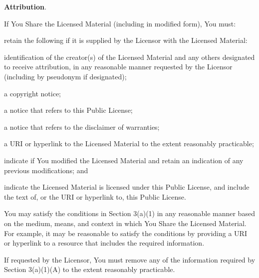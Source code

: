 	\begin{ccEnumerate}
		\item \par \textbf{Attribution}.
		      \begin{ccEnumerate}
		      	\item \par If You Share the Licensed Material (including in modified form), You must:
		      	      \begin{ccEnumerate}
		      	      	\item retain the following if it is supplied by the Licensor with the Licensed Material:
		      	      	      \begin{ccEnumerate}
		      	      	      	\item identification of the creator(s) of the Licensed Material and any others designated to receive attribution, in any reasonable manner requested by the Licensor (including by pseudonym if designated);
		      	      	      	\item a copyright notice;
		      	      	      	\item a notice that refers to this Public License; 
		      	      	      	\item a notice that refers to the disclaimer of warranties;
		      	      	      	\item a URI or hyperlink to the Licensed Material to the extent reasonably practicable;
		      	      	      \end{ccEnumerate}
		      	      	\item indicate if You modified the Licensed Material and retain an indication of any previous modifications; and
		      	      	\item indicate the Licensed Material is licensed under this Public License,
		      	      	      and include the text of, or the URI or hyperlink to, this Public
		      	      	      License.
		      	      \end{ccEnumerate}
		      	      
		      	\item You may satisfy the conditions in Section 3(a)(1) in any reasonable manner based on the medium, means, and context in which You Share the Licensed Material. For example, it may be reasonable to satisfy the conditions by providing a URI or hyperlink to a resource that includes the required information.
		      	\item If requested by the Licensor, You must remove any of the information required by Section 3(a)(1)(A) to the extent reasonably practicable.
		      \end{ccEnumerate}
		      

\end{ccEnumerate}

